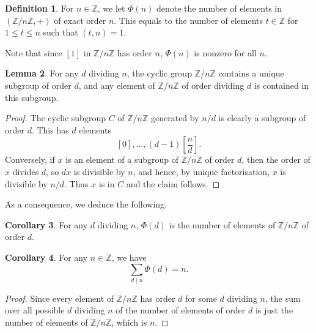 \documentclass{article}
\newcommand{\Z}{\mathbb{Z}}
\newcommand{\rb}[1]{\left( #1 \right)}
\renewcommand{\sb}[1]{\left[ #1 \right]}
\theoremstyle{definition}\newtheorem{definition}{Definition}[subsection]
\theoremstyle{definition}\newtheorem{remark}[definition]{Remark}
\theoremstyle{definition}\newtheorem*{example}{Example}
\theoremstyle{definition}\newtheorem*{note}{Note}
\newtheorem{lemma}[definition]{Lemma}
\newtheorem{corollary}[definition]{Corollary}
\begin{document}
\begin{definition}
For $ n \in \Z $, we let $ \Phi\rb{n} $ denote the number of elements in $ \rb{\Z / n\Z, +} $ of exact order $ n $. This equals to the number of elements $ t \in \Z $ for $ 1 \le t \le n $ such that $ \rb{t, n} = 1 $.
\end{definition}

Note that since $ \sb{1} $ in $ \Z / n\Z $ has order $ n $, $ \Phi\rb{n} $ is nonzero for all $ n $.

\begin{lemma}
For any $ d $ dividing $ n $, the cyclic group $ \Z / n\Z $ contains a unique subgroup of order $ d $, and any element of $ \Z / n\Z $ of order dividing $ d $ is contained in this subgroup.
\end{lemma}

\begin{proof}
The cyclic subgroup $ C $ of $ \Z / n\Z $ generated by $ n / d $ is clearly a subgroup of order $ d $. This has $ d $ elements
$$ \sb{0}, \dots, \rb{d - 1}\sb{\dfrac{n}{d}}. $$
Conversely, if $ x $ is an element of a subgroup of $ \Z / n\Z $ of order $ d $, then the order of $ x $ divides $ d $, so $ dx $ is divisible by $ n $, and hence, by unique factorisation, $ x $ is divisible by $ n / d $. Thus $ x $ is in $ C $ and the claim follows.
\end{proof}

As a consequence, we deduce the following.

\begin{corollary}
For any $ d $ dividing $ n $, $ \Phi\rb{d} $ is the number of elements of $ \Z / n\Z $ of order $ d $.
\end{corollary}

\begin{corollary}
\label{cor:6.4.3}
For any $ n \in \Z $, we have
$$ \sum_{d \mid n} \Phi\rb{d} = n. $$
\end{corollary}

\begin{proof}
Since every element of $ \Z / n\Z $ has order $ d $ for some $ d $ dividing $ n $, the sum over all possible $ d $ dividing $ n $ of the number of elements of order $ d $ is just the number of elements of $ \Z / n\Z $, which is $ n $.
\end{proof}
\end{document}
